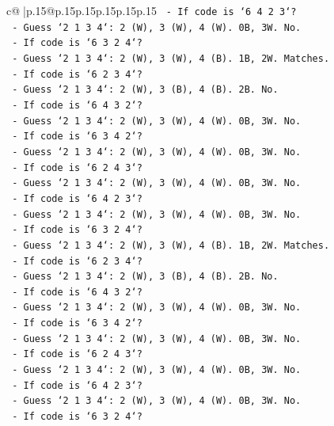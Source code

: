 \documentclass{article}
\begin{document}
{\begin{supertabular}{c@{$\;$}|p{.15\linewidth}@{}p{.15\linewidth}p{.15\linewidth}p{.15\linewidth}p{.15\linewidth}p{.15\linewidth}}
{{{\texttt{      {-} If code is `6 4 2 3`?} \\
\texttt{        {-} Guess `2 1 3 4`: 2 (W), 3 (W), 4 (W). 0B, 3W. No.} \\
\texttt{      {-} If code is `6 3 2 4`?} \\
\texttt{        {-} Guess `2 1 3 4`: 2 (W), 3 (W), 4 (B). 1B, 2W. Matches.} \\
\texttt{      {-} If code is `6 2 3 4`?} \\
\texttt{        {-} Guess `2 1 3 4`: 2 (W), 3 (B), 4 (B). 2B. No.} \\
\texttt{      {-} If code is `6 4 3 2`?} \\
\texttt{        {-} Guess `2 1 3 4`: 2 (W), 3 (W), 4 (W). 0B, 3W. No.} \\
\texttt{      {-} If code is `6 3 4 2`?} \\
\texttt{        {-} Guess `2 1 3 4`: 2 (W), 3 (W), 4 (W). 0B, 3W. No.} \\
\texttt{      {-} If code is `6 2 4 3`?} \\
\texttt{        {-} Guess `2 1 3 4`: 2 (W), 3 (W), 4 (W). 0B, 3W. No.} \\
\texttt{      {-} If code is `6 4 2 3`?} \\
\texttt{        {-} Guess `2 1 3 4`: 2 (W), 3 (W), 4 (W). 0B, 3W. No.} \\
\texttt{      {-} If code is `6 3 2 4`?} \\
\texttt{        {-} Guess `2 1 3 4`: 2 (W), 3 (W), 4 (B). 1B, 2W. Matches.} \\
\texttt{      {-} If code is `6 2 3 4`?} \\
\texttt{        {-} Guess `2 1 3 4`: 2 (W), 3 (B), 4 (B). 2B. No.} \\
\texttt{      {-} If code is `6 4 3 2`?} \\
\texttt{        {-} Guess `2 1 3 4`: 2 (W), 3 (W), 4 (W). 0B, 3W. No.} \\
\texttt{      {-} If code is `6 3 4 2`?} \\
\texttt{        {-} Guess `2 1 3 4`: 2 (W), 3 (W), 4 (W). 0B, 3W. No.} \\
\texttt{      {-} If code is `6 2 4 3`?} \\
\texttt{        {-} Guess `2 1 3 4`: 2 (W), 3 (W), 4 (W). 0B, 3W. No.} \\
\texttt{      {-} If code is `6 4 2 3`?} \\
\texttt{        {-} Guess `2 1 3 4`: 2 (W), 3 (W), 4 (W). 0B, 3W. No.} \\
\texttt{      {-} If code is `6 3 2 4`?} \\
}}}
\end{supertabular}}
\end{document}

